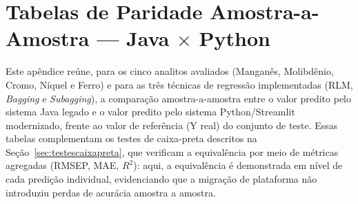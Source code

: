 
\chapter{Tabelas de Paridade Amostra-a-Amostra --- Java $\times$ Python}
\label{cha:paridadeamostra}

Este apêndice reúne, para os cinco analitos avaliados (Manganês, Molibdênio,
Cromo, Níquel e Ferro) e para as três técnicas de regressão implementadas
(RLM, \textit{Bagging} e \textit{Subagging}), a comparação amostra-a-amostra
entre o valor predito pelo sistema Java legado e o valor predito pelo sistema
Python/Streamlit modernizado, frente ao valor de referência (Y real) do
conjunto de teste. Essas tabelas complementam os testes de caixa-preta
descritos na Seção~\ref{sec:testescaixapreta}, que verificam a equivalência
por meio de métricas agregadas (RMSEP, MAE, $R^2$): aqui, a equivalência é
demonstrada em nível de cada predição individual, evidenciando que a migração
de plataforma não introduziu perdas de acurácia amostra a amostra.



